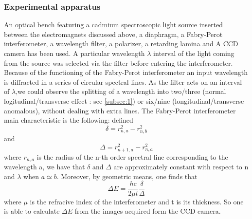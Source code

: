 \documentclass[a4paper,12pt,abstracton]{scrartcl}
\begin{document}
\subsubsection{Experimental apparatus}
An optical bench featuring a cadmium spectroscopic light source inserted between the electromagnets discussed above, a diaphragm, a Fabry-Perot interferometer, a wavelength filter, a polarizer, a retarding lamina and A CCD camera has been used. A particular wavelength $\lambda$ interval of the light coming from the source was selected via the filter before entering the interferometer. Because of the functioning of the Fabry-Perot interferometer an input wavelength is diffracted in a series of circular spectral lines. As the filter acts on an interval of $\lambda$,we could observe the splitting of a wavelength into two/three (normal logitudinal/transverse effect : see \ref{subsec:1}) or six/nine (longitudinal/transverse anomalous), without dealing with extra lines. The Fabry-Perot interferometer main characteristic is the following:\newline
defined $$\delta = r^2_{n,a}-r^2_{n,b}$$ and $$\Delta = r^2_{n+1,a}-r^2_{n,a}$$  where $r_{n,a}$ is the radius of the n-th order spectral line corresponding to the wavelength a, we have that $\delta$ and $\Delta$ are approximately constant with respect to n and $\lambda$ when $a\simeq b$. Moreover, by geometric means, one finds that 
\begin{equation} \label{eq:1}
\Delta E  = \frac{hc}{2\mu t} \frac{\delta}{\Delta}
\end{equation}
 where $\mu$ is the refracive index of the interferometer and t is its thickness. So one is able to calculate $\Delta E$ from the images acquired form the CCD camera.
\end{document}
